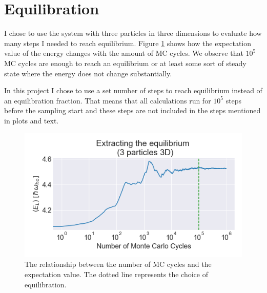 \section{Equilibration}\label{app:equlibration}

I chose to use the system with three particles in three dimensions to evaluate how many steps I needed to reach equilibrium. Figure \ref{fig:equilibrium} shows how the expectation value of the energy changes with the amount of MC cycles. We observe that $10^5$ MC cycles are enough to reach an equilibrium or at least some sort of steady state where the energy does not change substantially. 

In this project I chose to use a set number of steps to reach equilibrium instead of an equilibration fraction. That means that all calculations run for $10^5$ steps before the sampling start and these steps are not included in the steps mentioned in plots and text.

\begin{figure}[H]
\center
\includegraphics[width=0.7\linewidth]{../Results/equilibrium}\caption{The relationship between the number of MC cycles and the expectation value. The dotted line represents the choice of equilibration.}\label{fig:equilibrium}
\end{figure} 
